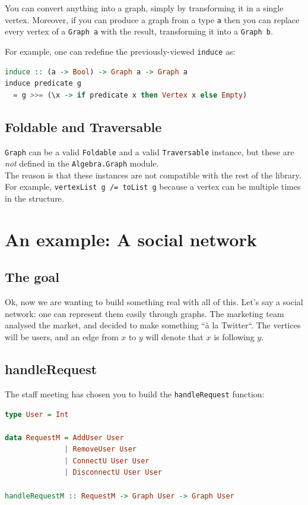 \documentclass[10pt,a4paper]{article}
\begin{document}
You can convert anything into a graph, simply by transforming it in a single vertex. Moreover, if you can produce a graph from a type \verb|a| then you can replace every vertex of a \verb|Graph a| with the result, transforming it into a \verb|Graph b|.

For example, one can redefine the previously-viewed \verb|induce| as:

\begin{lstlisting}[language=Haskell, frame=single]
induce :: (a -> Bool) -> Graph a -> Graph a
induce predicate g
  = g >>= (\x -> if predicate x then Vertex x else Empty)
\end{lstlisting}

\subsection{Foldable and Traversable}
\verb|Graph| can be a valid \verb|Foldable| and a valid \verb|Traversable| instance, but these are \emph{not} defined in the \verb|Algebra.Graph| module.\\
The reason is that these instances are not compatible with the rest of the library. For example, \verb|vertexList g /= toList g| because a vertex can be multiple times in the structure.

\section{An example: A social network}
\subsection{The goal}

Ok, now we are wanting to build something real with all of this. Let's say a social network: one can represent them easily through graphs.
The marketing team analysed the market, and decided to make something ``à la Twitter``. The vertices will be users, and an edge from $x$ to $y$ will denote that $x$ is following $y$.

\subsection{handleRequest}
The staff meeting has chosen you to build the \verb|handleRequest| function:
\begin{lstlisting}[language=Haskell, frame=single]
type User = Int

data RequestM = AddUser User
			  | RemoveUser User
			  | ConnectU User User
			  | DisconnectU User User

handleRequestM :: RequestM -> Graph User -> Graph User
\end{lstlisting}
\end{document}
